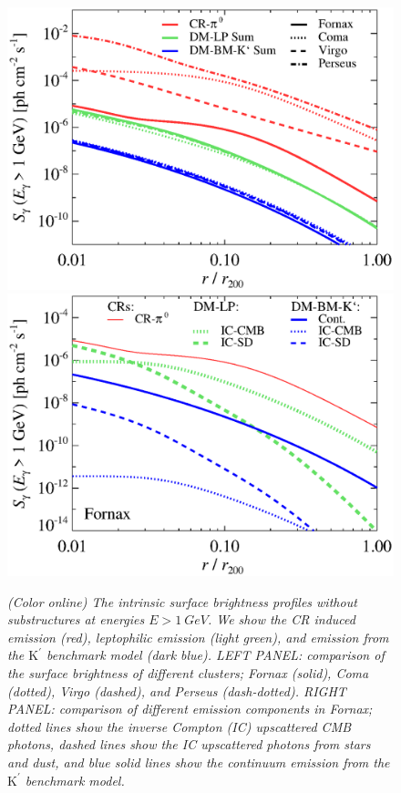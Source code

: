 \documentclass[10pt,aps,pra,reprint,amsmath,amsfonts,amssymb,showpacs,nofootinbib,floatfix]{revtex4-1}
\newcommand{\rmn}{\mathrm}
\newcommand{\Kp}{\rmn{K}^\prime}
\begin{document}
\begin{figure}
\begin{minipage}{2.0\columnwidth}
  \includegraphics[width=0.49\columnwidth]{figures/SB.v14.1GeV.SF700.noSuB.elmu.bw.eps}
  \includegraphics[width=0.49\columnwidth]{figures/SB.fornax.v14.1GeV.SF700.noSuB.elmu.bw.eps}
  \caption{\it (Color online) The intrinsic surface brightness
    profiles without substructures at energies $E>1\ GeV$. We show the
    CR induced emission (red), leptophilic emission (light green), and
    emission from the $\Kp$ benchmark model (dark blue). LEFT PANEL:
    comparison of the surface brightness of different clusters; Fornax
    (solid), Coma (dotted), Virgo (dashed), and Perseus
    (dash-dotted). RIGHT PANEL: comparison of different emission
    components in Fornax; dotted lines show the inverse Compton (IC)
    upscattered CMB photons, dashed lines show the IC upscattered
    photons from stars and dust, and blue solid lines show the
    continuum emission from the $\Kp$ benchmark model.}
 \label{fig:SB_clu_nosub}
\end{minipage}
\end{figure}
\end{document}
